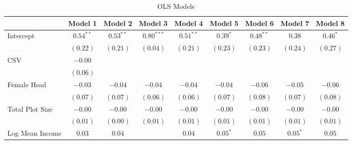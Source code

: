 \documentclass[
]{article}
\begin{document}
\begin{table}
\caption{OLS Models}
\begin{center}
\begin{tabular}{l c c c c c c c c}
\hline
 & Model 1 & Model 2 & Model 3 & Model 4 & Model 5 & Model 6 & Model 7 & Model 8 \\
\hline
Intercept            & $\mathbf{0.54}^{**}$ & $\mathbf{0.53}^{**}$ & $\mathbf{0.80}^{***}$ & $\mathbf{0.51}^{**}$ & $0.39^{*}$            & $\mathbf{0.48}^{**}$   & $0.38$                & $0.46^{*}$            \\
                     & $(0.22)$             & $(0.21)$             & $(0.04)$              & $(0.21)$             & $(0.23)$              & $(0.23)$               & $(0.24)$              & $(0.27)$              \\
CSV                  & $-0.00$              &                      &                       &                      &                       &                        &                       &                       \\
                     & $(0.06)$             &                      &                       &                      &                       &                        &                       &                       \\
Female Head          & $-0.03$              & $-0.04$              & $-0.04$               & $-0.04$              & $-0.04$               & $-0.06$                & $-0.05$               & $-0.06$               \\
                     & $(0.07)$             & $(0.07)$             & $(0.06)$              & $(0.06)$             & $(0.07)$              & $(0.08)$               & $(0.07)$              & $(0.08)$              \\
Total Plot Size      & $-0.00$              & $-0.00$              & $-0.00$               & $-0.00$              & $-0.00$               & $-0.00$                & $-0.00$               & $-0.00$               \\
                     & $(0.01)$             & $(0.00)$             & $(0.01)$              & $(0.01)$             & $(0.01)$              & $(0.01)$               & $(0.01)$              & $(0.01)$              \\
Log Mean Income      & $0.03$               & $0.04$               &                       & $0.04$               & $0.05^{*}$            & $0.05$                 & $0.05^{*}$            & $0.05$                \\

\end{tabular}
\end{center}
\end{table}
\end{document}

